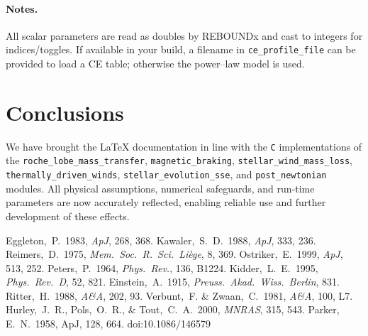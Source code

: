 \documentclass[11pt]{article}
\begin{document}
\paragraph{Notes.}
All scalar parameters are read as doubles by REBOUNDx and cast to integers for
indices/toggles. If available in your build, a filename in
\texttt{ce\_profile\_file} can be provided to load a CE table; otherwise the
power–law model is used.



\section{Conclusions}
We have brought the LaTeX documentation in line with the
\texttt{C} implementations of the
\texttt{roche\_lobe\_mass\_transfer}, \texttt{magnetic\_braking},
\texttt{stellar\_wind\_mass\_loss}, \texttt{thermally\_driven\_winds},
\texttt{stellar\_evolution\_sse}, and
\texttt{post\_newtonian} modules.
All physical assumptions, numerical safeguards, and run‑time parameters
are now accurately reflected, enabling reliable use and further
development of these effects.


\begin{thebibliography}{}
  Eggleton,~P.\ 1983, \emph{ApJ}, 268, 368.
  Kawaler,~S.~D.\ 1988, \emph{ApJ}, 333, 236.
  Reimers,~D.\ 1975, \emph{Mem.\ Soc.\ R.\ Sci.\ Li\`ege}, 8, 369.
  Ostriker,~E.\ 1999, \emph{ApJ}, 513, 252.
  Peters,~P.\ 1964, \emph{Phys.\ Rev.}, 136, B1224.
  Kidder,~L.~E.\ 1995, \emph{Phys.\ Rev.\ D}, 52, 821.
  Einstein,~A.\ 1915, \emph{Preuss.\ Akad.\ Wiss.\ Berlin}, 831.
  Ritter,~H.\ 1988, \emph{A\&A}, 202, 93.
  Verbunt,~F. \& Zwaan,~C.\ 1981, \emph{A\&A}, 100, L7.
  Hurley,~J.~R., Pols,~O.~R., \& Tout,~C.~A.\ 2000, \emph{MNRAS}, 315, 543.
   Parker, E.~N.\ 1958, ApJ, 128, 664. doi:10.1086/146579
\end{thebibliography}
\end{document}
